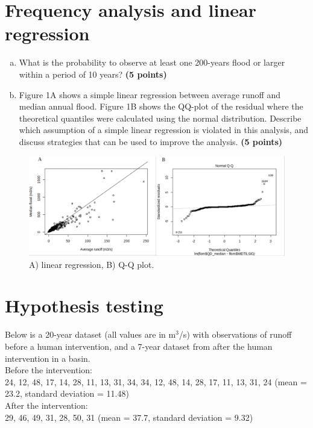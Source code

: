 \documentclass[12pt]{article}
\begin{document}
\section{Frequency analysis and linear regression}
\begin{enumerate}[(a)]
\item What is the probability to observe at least one 200-years flood or larger within a period of 10 years? \textbf{\hfill (5 points)}
\item Figure 1A shows a simple linear regression between average runoff and median annual flood. Figure 1B shows the QQ-plot of the residual where the theoretical quantiles were calculated using the normal distribution. Describe which assumption of a simple linear regression is violated in this analysis, and discuss strategies that can be used to improve the analysis. \textbf{\hfill (5 points)}
\end{enumerate}

\begin{figure}[h!]
    \centering
    \includegraphics[width=.8\textwidth]{fig01} 
    \caption{A) linear regression, B) Q-Q plot.}
\end{figure}


\section{Hypothesis testing}
Below is a 20-year dataset (all values are in m$^3$/s) with observations of runoff before a human intervention, and a 7-year dataset from after the human intervention in a basin. \\

Before the intervention:\\
24, 12, 48, 17, 14, 28, 11, 13, 31, 34, 34, 12, 48, 14, 28, 17, 11, 13, 31, 24 (mean = 23.2, standard deviation = 11.48)\\

After the intervention:\\
29, 46, 49, 31, 28, 50, 31 (mean = 37.7, standard deviation = 9.32)\\
\end{document}
